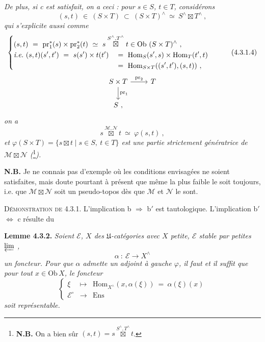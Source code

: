 \documentclass[11pt]{article}
\newcommand{\msp}[1]{\marginpar{\footnotesize [#1]}}
\newcommand{\Hom}{\mathrm{Hom}}
\newcommand{\Ob}{\mathrm{Ob}\,}
\newcommand{\pr}{\operatorname{pr}}
\begin{document}
\noindent\textit{De plus, si c est satisfait, on a ceci : pour $s\in S$, $t\in T$, considérons}
\[
(s,t)\ \in\ (S\times T)\ \subset\ (S\times T)^\wedge\ \simeq\ S^\wedge\boxtimes T^\wedge\ ,
\]
\textit{qui s'explicite aussi comme}
\[
\left\{
\begin{aligned}
&\rlap{$\displaystyle (s,t)\ =\ \pr_1^*(s)\times\pr_2^*(t)\ \simeq\ s\overset{S^\wedge,T^\wedge}{\boxtimes}t\in\Ob\,(S\times T)^\wedge\ ,$}\\
&\textit{i.e.}\ (s,t)(s',t')\ =\ s(s')\times t(t') &&=\ \Hom_S(s',s)\times\Hom_T(t',t)\\
& &&=\ \Hom_{S\times T}((s',t'),(s,t))\ ,
\end{aligned}
\right.
\tag*{(4.3.1.4)}
\]
\[
\begin{tikzcd}
S\times T \arrow[r, "\mathrm{pr}_2"] \arrow[d, "\mathrm{pr}_1"] & T\\
S\ ,
\end{tikzcd}
\]
\msp{page 66}\textit{on a}
\[
s\overset{\mathcal M,\mathcal N}{\boxtimes}t\ \simeq\ \varphi(s,t)\ ,
\tag*{(4.3.1.4)}
\]
\textit{et $\varphi(S\times T)=\{s\boxtimes t\mid s\in S,\ t\in T\}$ est une partie strictement génératrice de $\mathcal M\boxtimes\mathcal N$ (}\footnote{\textbf{N.B.} On a bien sûr $(s,t)=s\overset{S^\wedge,T^\wedge}{\boxtimes}t$.}\textit{).}

\noindent\textbf{N.B.} Je ne connais pas d'exemple où les conditions envisagées ne soient satisfaites, mais doute pourtant à présent que même la plus faible le soit toujours, i.e. que $\mathcal M\boxtimes\mathcal N$ soit un pseudo-topos dès que $\mathcal M$ et $\mathcal N$ le sont.

\noindent\textsc{Démonstration de} 4.3.1. L'implication b $\Longrightarrow$ b$'$ est tautologique. L'implication b$'$ $\Longleftrightarrow$ c résulte du

\noindent\textbf{Lemme 4.3.2.} \textit{Soient $\mathcal E$, $X$ des $\mathfrak U$-catégories avec $X$ petite, $\mathcal E$ stable par petites $\varprojlim$ ,}
\[
\alpha\ :\ \mathcal E\longrightarrow X^\wedge
\]
\textit{un foncteur. Pour que $\alpha$ admette un adjoint à gauche $\varphi$, il faut et il suffit que pour tout $x\in\Ob X$, le foncteur}
\[
\left\{
\begin{array}{ccl}
\xi & \longmapsto & \Hom_{X^\wedge}(x,\alpha(\xi))\ =\ \alpha(\xi)(x)\\
\mathcal E^\circ & \longrightarrow & \mathrm{Ens}
\end{array}
\right.
\]
\textit{soit représentable.}
\end{document}
